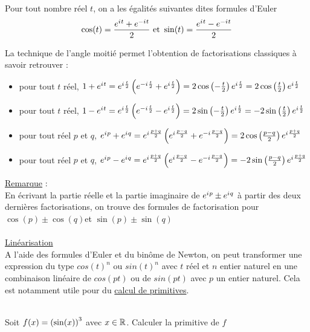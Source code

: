 \begin{defprop}
	Pour tout nombre réel \(t\), on a les égalités suivantes dites formules d’Euler
	\[\cos(t) = \frac{e^{i\mkern1mu t}+e^{-i\mkern1mu t}}{2} \text{ et } \sin(t) = \frac{e^{i\mkern1mu t} - e^{-i\mkern1mu t}}{2}\]
\end{defprop}
\begin{prop}

	La technique de l’angle moitié permet l’obtention de factorisations classiques à savoir retrouver :
	\begin{itemize}
		\item pour tout \(t\) réel, \(1+e^{i\mkern1mu t} = e^{i\mkern1mu \frac{t}{2}}\left(e^{-i\mkern1mu \frac{t}{2}}+e^{i\mkern1mu \frac{t}{2}}\right) = 2 \cos\left(-\frac{t}{2}\right)e^{i\mkern1mu \frac{t}{2}} = 2 \cos\left(\frac{t}{2}\right)e^{i\mkern1mu \frac{t}{2}} \)
		\item pour tout \(t\) réel, \(1-e^{i\mkern1mu t} = e^{i\mkern1mu \frac{t}{2}}\left(e^{-i\mkern1mu \frac{t}{2}}-e^{i\mkern1mu \frac{t}{2}}\right) = 2 \sin\left(-\frac{t}{2}\right)e^{i\mkern1mu \frac{t}{2}} = -2 \sin\left(\frac{t}{2}\right)e^{i\mkern1mu \frac{t}{2}} \)
		\item pour tout réel \(p\) et \(q\), \(e^{i\mkern1mu p}+e^{i\mkern1mu q} = e^{i\mkern1mu \frac{p+q}{2}}\left(e^{i\mkern1mu \frac{p-q}{2}}+e^{-i\mkern1mu \frac{p-q}{2}}\right) = 2 \cos\left(\frac{p-q}{2}\right)e^{i\mkern1mu \frac{p+q}{2}}  \)
		\item pour tout réel \(p\) et \(q\), \(e^{i\mkern1mu p}-e^{i\mkern1mu q} = e^{i\mkern1mu \frac{p+q}{2}}\left(e^{i\mkern1mu \frac{p-q}{2}}-e^{-i\mkern1mu \frac{p-q}{2}}\right) = - 2 \sin\left(\frac{p-q}{2}\right)e^{i\mkern1mu \frac{p+q}{2}}  \)
	\end{itemize}
	\underline{Remarque} : \\
	En écrivant la partie réelle et la partie imaginaire de \(e^{i\mkern1mu p} \pm e^{i\mkern1mu q}\) à partir des deux dernières factorisations, on trouve des formules de factorisation pour \(\cos (p) \pm \cos (q) \)et \(\sin (p) \pm \sin (q)\) \\ \\
	\underline{Linéarisation} \\
	A l’aide des formules d’Euler et du binôme de Newton, on peut transformer une expression du type
	\(cos(t)^n\) ou \(sin(t)^n\) avec \(t\) réel et \(n\) entier naturel en une combinaison linéaire de \(cos(pt)\) ou de \(sin(pt)\)
	avec \(p\) un entier naturel. Cela est notamment utile pour du \underline{calcul de primitives}.
\end{prop}

\begin{exoex}
	~\\Soit \(f(x) = \left(\sin(x)\right)^3\) avec \(x \in \mathbb{R}\). Calculer la primitive de \(f\)
\end{exoex}

